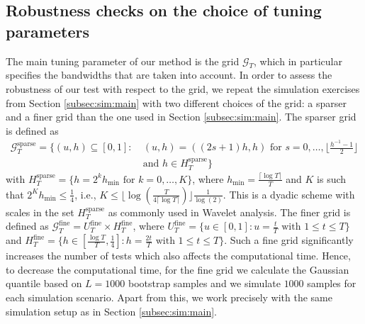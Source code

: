 \documentclass[12pt]{article}
\begin{document}
\subsection{Robustness checks on the choice of tuning parameters}\label{subsec:sim:grid}


The main tuning parameter of our method is the grid $\mathcal{G}_T$, which in particular specifies the bandwidths that are taken into account. In order to assess the robustness of our test with respect to the grid, we repeat the simulation exercises from Section \ref{subsec:sim:main} with two different choices of the grid: a sparser and a finer grid than the one used in Section \ref{subsec:sim:main}.
The sparser grid is defined as
\begin{align}
\mathcal{G}_T^{\text{sparse}} = \big\{ (u,h) \subseteq [0,1]: & \ (u,h) = ((2s+1) h, h) \text{ for } s = 0,\ldots,\Big\lfloor \frac{h^ {-1}-1}{2} \Big\rfloor \nonumber \\ & \ \text{and } h \in H_T^{\text{sparse}} \big\} \label{eq:grid-sparse}
\end{align}
with $H_T^{\text{sparse}} = \{ h = 2^k h_{\min} \text{ for } k=0,\ldots,K \}$, where $h_{\min} = \frac{\lceil \log T \rceil}{T}$ and $K$ is such that $2^K h_{\min} \le \frac{1}{4}$, i.e., $K \le \lfloor \log(\frac{T}{4 \lceil \log T \rceil }) \rfloor \frac{1}{\log(2)}$. This is a dyadic scheme with scales in the set $H_T^{\text{sparse}}$ as commonly used in Wavelet analysis. 
The finer grid is defined as
$\mathcal{G}_T^{\text{fine}} = U_T^{\text{fine}} \times H_T^{\text{fine}}$,
where  
$U_T^{\text{fine}}  = \{ u \in [0,1]: u = \textstyle{\frac{t}{T}} \text{ with } 1 \le t \le T \}$
and
$H_T^{\text{fine}} = \{ h \in [ \textstyle{\frac{\log T}{T}}, \textstyle{\frac{1}{4}} ]:  h = \textstyle{\frac{2t}{T}} \text{ with } 1 \le t \le T \}$. Such a fine grid significantly increases the number of tests which also affects the computational time. Hence, to decrease the computational time, for the fine grid we calculate the Gaussian quantile based on $L = 1000$ bootstrap samples and we simulate $1000$ samples for each simulation scenario. Apart from this, we work precisely with the same simulation setup as in Section \ref{subsec:sim:main}.
\end{document}
